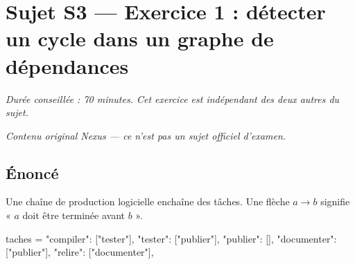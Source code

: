 \section*{Sujet S3 --- Exercice 1 : détecter un cycle dans un graphe de dépendances}

\textit{Durée conseillée : 70 minutes. Cet exercice est indépendant des deux
autres du sujet.}

\medskip
\textit{Contenu original Nexus --- ce n'est pas un sujet officiel d'examen.}

\subsection*{Énoncé}

Une chaîne de production logicielle enchaîne des tâches. Une flèche
$a \rightarrow b$ signifie « $a$ doit être terminée avant $b$ ».

\begin{python}
taches = {
    "compiler":   ["tester"],
    "tester":     ["publier"],
    "publier":    [],
    "documenter": ["publier"],
    "relire":     ["documenter"],
}
\end{python}

